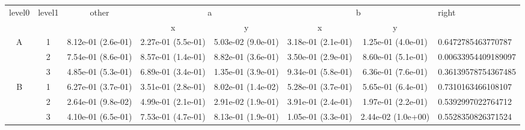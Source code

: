 \begin{tabular}{cccccccl}
\toprule
\multirow{2}{*}{level0} & \multirow{2}{*}{level1}& \multirow{2}{*}{other}&\multicolumn{2}{c}{a}&\multicolumn{2}{c}{b}& \multirow{2}{*}{right}\tabularnewline
\cmidrule(lr){4-5}
\cmidrule(lr){6-7}
&&&x&y&x&y\tabularnewline
\midrule
\multirow{3}{*}{A}&1& 8.12e-01 (2.6e-01)& 2.27e-01 (5.5e-01)& 5.03e-02 (9.0e-01)& 3.18e-01 (2.1e-01)& 1.25e-01 (4.0e-01)& 0.6472785463770787\tabularnewline
&2& 7.54e-01 (8.6e-01)& 8.57e-01 (1.4e-01)& 8.82e-01 (3.6e-01)& 3.50e-01 (2.9e-01)& 8.60e-01 (5.1e-01)& 0.00633954409189097\tabularnewline
&3& 4.85e-01 (5.3e-01)& 6.89e-01 (3.4e-01)& 1.35e-01 (3.9e-01)& 9.34e-01 (5.8e-01)& 6.36e-01 (7.6e-01)& 0.36139578754367485\tabularnewline
\midrule
\multirow{3}{*}{B}&1& 6.27e-01 (3.7e-01)& 3.51e-01 (2.8e-01)& 8.02e-01 (1.4e-02)& 5.28e-01 (3.7e-01)& 5.65e-01 (6.4e-01)& 0.7310163466108107\tabularnewline
&2& 2.64e-01 (9.8e-02)& 4.99e-01 (2.1e-01)& 2.91e-02 (1.9e-01)& 3.91e-01 (2.4e-01)& 1.97e-01 (2.2e-01)& 0.5392997022764712\tabularnewline
&3& 4.10e-01 (6.5e-01)& 7.53e-01 (4.7e-01)& 8.13e-01 (1.9e-01)& 1.05e-01 (3.3e-01)& 2.44e-02 (1.0e+00)& 0.5528350826371524\tabularnewline
\bottomrule
\end{tabular}
